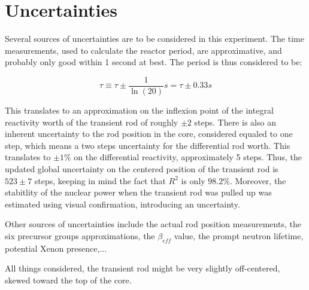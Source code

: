 \section{Uncertainties}

Several sources of uncertainties are to be considered in this experiment. The time measurements, used to calculate the reactor period, are approximative, and probably only good within 1 second at best. The period is thus considered to be:

\begin{equation}\label{eq9}
\tau \equiv \tau \pm \frac{1}{\ln(20)} s = \tau \pm 0.33 s
\end{equation}

This translates to an approximation on the inflexion point of the integral reactivity worth of the transient rod of roughly $\pm 2$ steps. There is also an inherent uncertainty to the rod position in the core, considered equaled to one step, which means a two steps uncertainty for the differential rod worth. This translates to $\pm 1\%$ on the differential reactivity, approximately 5 steps. Thus, the updated global uncertainty on the centered position of the transient rod is $523 \pm 7$ steps, keeping in mind the fact that $R^2$ is only $98.2\%$. Moreover, the stabitlity of the nuclear power when the transient rod was pulled up was estimated using visual confirmation, introducing an uncertainty.

Other sources of uncertainties include the actual rod position measurements, the six precursor groups approximations, the $\beta_{eff}$ value, the prompt neutron lifetime, potential Xenon presence,...

All things considered, the transient rod might be very slightly off-centered, skewed toward the top of the core.
